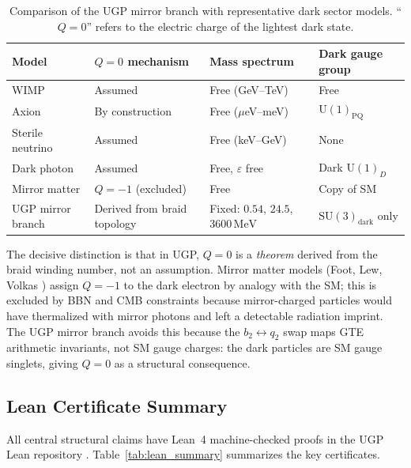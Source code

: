 \documentclass[11pt]{article}
\begin{document}
\begin{table}[H]
\centering
\caption{Comparison of the UGP mirror branch with representative dark sector models.
``$Q=0$'' refers to the electric charge of the lightest dark state.}
\label{tab:model_comparison}
\begin{tabularx}{\textwidth}{P{3.5cm} P{3.2cm} P{3.2cm} >{\RaggedRight\arraybackslash}X}
\toprule
\textbf{Model} & \textbf{$Q=0$ mechanism} & \textbf{Mass spectrum} & \textbf{Dark gauge group} \\
\midrule
WIMP & Assumed & Free (GeV--TeV) & Free \\
Axion & By construction & Free ($\mu$eV--meV) & $\mathrm{U}(1)_\mathrm{PQ}$ \\
Sterile neutrino & Assumed & Free (keV--GeV) & None \\
Dark photon & Assumed & Free, $\varepsilon$ free & Dark $\mathrm{U}(1)_D$ \\
Mirror matter \cite{FootLewVolkas1991} & $Q=-1$ (excluded) & Free & Copy of SM \\
UGP mirror branch & Derived from braid topology & Fixed: $0.54$, $24.5$, $3600\,\mathrm{MeV}$ & $\mathrm{SU}(3)_\mathrm{dark}$ only \\
\bottomrule
\end{tabularx}
\end{table}

The decisive distinction is that in UGP, $Q=0$ is a \emph{theorem} derived from the
braid winding number, not an assumption. Mirror matter models (Foot, Lew, Volkas
\cite{FootLewVolkas1991}) assign $Q=-1$ to the dark electron by analogy with the SM;
this is excluded by BBN and CMB constraints because mirror-charged particles would have
thermalized with mirror photons and left a detectable radiation imprint. The UGP
mirror branch avoids this because the $b_2 \leftrightarrow q_2$ swap maps GTE arithmetic
invariants, not SM gauge charges: the dark particles are SM gauge singlets, giving $Q=0$
as a structural consequence.

\subsection{Lean Certificate Summary}
\label{ssec:lean_summary}

All central structural claims have Lean~4 machine-checked proofs in the UGP Lean
repository \cite{SpivackUGPPhysicsLean}. Table~\ref{tab:lean_summary} summarizes the
key certificates.
\end{document}
